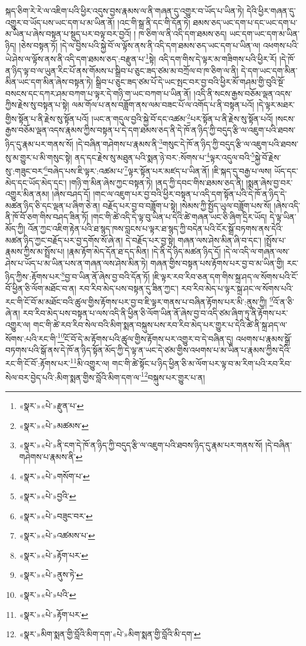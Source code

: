 སྐད་ཅིག་རེ་རེ་ལ་འཇིག་པའི་ཕྱིར་འདུས་བྱས་རྣམས་ལ་ནི་གཞན་དུ་འགྱུར་བ་ཡོད་པ་ཡིན་ཏེ། དེའི་ཕྱིར་གཞན་དུ་འགྱུར་བ་ཡོད་པས་ཡང་དག་པ་མ་ཡིན་ནོ། །འང་གི་སྒྲ་ནི་དང་གི་དོན་ཏེ། ཐམས་ཅད་ཡང་དག་པ་དང་ཡང་དག་པ་མ་ཡིན་པ་ཞེས་བསྟན་པ་སྡུད་པར་བལྟ་བར་བྱའོ། །
ཁ་ཅིག་ལ་ནི་འདི་དག་ཐམས་ཅད། ཡང་དག་ཡང་དག་མ་ཡིན་ཉིད། །ཅེས་བསྟན་ཏོ། །དེ་ལ་བྱིས་པའི་སྐྱེ་བོ་ལ་ལྟོས་ནས་ནི་འདི་དག་ཐམས་ཅད་ཡང་དག་པ་ཡིན་ལ། འཕགས་པའི་ཡེ་ཤེས་ལ་ལྟོས་ནས་ནི་འདི་དག་ཐམས་ཅད་:བརྫུན་པ་\footnote{«སྣར་»«པེ་»རྫུན་པ་}སྟེ། འདི་དག་གིས་དེ་ལྟར་མ་གཟིགས་པའི་ཕྱིར་རོ། །དེ་ཁོ་ན་ཉིད་ལྟ་བ་ལ་ཡུན་རིང་པོ་ནས་གོམས་པ་སྒྲིབ་པ་ཅུང་ཟད་ཙམ་མ་བཀྲོལ་བ་ཁ་ཅིག་ལ་ནི། དེ་དག་ཡང་དག་མིན་མིན་ཡང་དག་མིན་ཞེས་བསྟན་ཏེ། སྒྲིབ་པ་ཅུང་ཟད་ཙམ་པོ་དེ་ཡང་སྤང་བར་བྱ་བའི་ཕྱིར་མོ་གཤམ་གྱི་བུའི་སྔོ་བསངས་དང་དཀར་ཤམ་བཀག་པ་ལྟར་དེ་གཉི་ག་ཡང་བཀག་པ་ཡིན་ནོ། །འདི་ནི་སངས་རྒྱས་བཅོམ་ལྡན་འདས་ཀྱིས་རྗེས་སུ་བསྟན་པ་སྟེ། ལམ་གོལ་པ་ནས་བཟློག་ནས་ལམ་བཟང་པོ་ལ་འགོད་པ་ནི་བསྟན་པའོ། །དེ་ལྟར་མཐར་གྱིས་སྟོན་པ་ནི་རྗེས་སུ་སྟོན་པའོ། །ཡང་ན་གདུལ་བྱའི་སྐྱེ་བོ་དང་འཚམ་\footnote{«སྣར་»«པེ་»མཚམས་}པར་སྟོན་པ་ནི་རྗེས་སུ་སྟོན་པའོ། །སངས་རྒྱས་བཅོམ་ལྡན་འདས་རྣམས་ཀྱིས་བསྟན་པ་དེ་དག་ཐམས་ཅད་ནི་དེ་ཁོ་ན་ཉིད་ཀྱི་བདུད་རྩི་ལ་འཇུག་པའི་ཐབས་ཉིད་དུ་རྣམ་པར་གནས་སོ། །དེ་བཞིན་གཤེགས་པ་རྣམས་ནི་\footnote{«སྣར་»«པེ་»ནི་ངག་དེ་ཁོ་ན་ཉིད་ཀྱི་བདུད་རྩི་ལ་འཇུག་པའི་ཐབས་ཉིད་དུ་རྣམ་པར་གནས་སོ། །དེ་བཞིན་གཤེགས་པ་རྣམས་ནི་}གསུང་དེ་ཁོ་ན་ཉིད་ཀྱི་བདུད་རྩི་ལ་འཇུག་པའི་ཐབས་སུ་མ་གྱུར་པ་མི་གསུང་སྟེ། ནད་དང་རྗེས་སུ་མཐུན་པའི་སྨན་ཉེ་བར་:སོགས་པ་\footnote{«སྣར་»«པེ་»གསོག་པ་}ལྟར་འདུལ་བའི་\footnote{«སྣར་»«པེ་»བྱའི་}སྐྱེ་བོ་རྗེས་སུ་:གཟུང་བར་\footnote{«སྣར་»«པེ་»བཟུང་བར་}བཞེད་པས་ཇི་ལྟར་:འཚམ་པ་\footnote{«སྣར་»«པེ་»འཚམས་པ་}ལྟར་སྟོན་པར་མཛད་པ་ཡིན་ནོ། །ཇི་སྐད་དུ་བརྒྱ་པ་ལས། ཡོད་དང་མེད་དང་ཡོད་མེད་དང་། །གཉི་ག་མིན་ཞེས་ཀྱང་བསྟན་ཏེ། །ནད་ཀྱི་དབང་གིས་ཐམས་ཅད་ནི། །སྨན་ཞེས་བྱ་བར་འགྱུར་མིན་ནམ། །ཞེས་བཤད་དོ། །གང་ལ་འཇུག་པར་བྱ་བའི་ཕྱིར་བསྟན་པ་འདི་དག་སྟོན་པའི་དེ་ཁོ་ན་ཉིད་དེ་མཚན་ཉིད་ཅི་དང་ལྡན་པ་ཞིག་ཅེ་ན། བརྗོད་པར་བྱ་བ་བཟློག་པ་སྟེ། །སེམས་ཀྱི་སྤྱོད་ཡུལ་བཟློག་པས་སོ། །ཞེས་འདི་ནི་ཁོ་བོ་ཅག་གིས་བཤད་ཟིན་ཏོ། །གང་གི་ཚེ་འདི་དེ་ལྟ་བུ་ཡིན་པ་དེའི་ཚེ་གཞན་ཡང་ཅི་ཞིག་དྲིར་ཡོད། དེ་ལྟ་ཡིན་མོད་ཀྱི། འོན་ཀྱང་འཇིག་རྟེན་པའི་ཐ་སྙད་ཁས་བླངས་པ་ལྟར་ཐ་སྙད་ཀྱི་བདེན་པའི་ངོར་སྒྲོ་བཏགས་ནས་དེའི་མཚན་ཉིད་ཀྱང་བརྗོད་པར་བྱ་དགོས་སོ་ཞེ་ན། དེ་བརྗོད་པར་བྱ་སྟེ། གཞན་ལས་ཤེས་མིན་ཞི་བ་དང་། །སྤྲོས་པ་རྣམས་ཀྱིས་མ་སྤྲོས་པ། །རྣམ་རྟོག་མེད་དོན་ཐ་དད་མིན། །དེ་ནི་དེ་ཉིད་མཚན་ཉིད་དོ། །དེ་ལ་འདི་ལ་གཞན་ལས་ཤེས་པ་ཡོད་པ་མ་ཡིན་པས་ན་གཞན་ལས་ཤེས་མིན་ཏེ། གཞན་གྱིས་བསྟན་པས་རྟོགས་པར་བྱ་བ་མ་ཡིན་གྱི། རང་ཉིད་ཀྱིས་:རྟོགས་པར་\footnote{«སྣར་»«པེ་»རྟོག་པར་}བྱ་བ་ཡིན་ནོ་ཞེས་བྱ་བའི་དོན་ཏོ། །ཇི་ལྟར་རབ་རིབ་ཅན་དག་གིས་སྐྲ་ཤད་ལ་སོགས་པའི་ངོ་བོ་ཕྱིན་ཅི་ལོག་མཐོང་བ་ན། རབ་རིབ་མེད་པས་བསྟན་དུ་ཟིན་ཀྱང་། རབ་རིབ་མེད་པ་ལྟར་སྐྲ་ཤང་ལ་སོགས་པའི་རང་གི་ངོ་བོ་མ་མཐོང་བའི་ཚུལ་གྱིས་རྟོགས་པར་བྱ་བ་ཇི་ལྟར་གནས་པ་བཞིན་རྟོགས་པར་མི་:ནུས་ཀྱི། \footnote{«སྣར་»«པེ་»ནུས་ཏེ་}འོ་ན་ཅི་ཞེ་ན། རབ་རིབ་མེད་པས་བསྟན་པ་ལས་འདི་ནི་ཕྱིན་ཅི་ལོག་ཡིན་ནོ་ཞེས་བྱ་བ་འདི་ཙམ་ཞིག་ཏུ་ནི་རྟོགས་པར་འགྱུར་ལ། གང་གི་ཚེ་རབ་རིབ་སེལ་བའི་མིག་སྨན་བསྐུས་པས་རབ་རིབ་མེད་པར་གྱུར་པ་དེའི་ཚེ་ནི་སྐྲ་ཤད་ལ་སོགས་:པའི་རང་གི་\footnote{«སྣར་»«པེ་»པའི་}ངོ་བོ་དེ་མ་རྟོགས་པའི་ཚུལ་གྱིས་རྟོགས་པར་འགྱུར་བ་དེ་བཞིན་དུ། འཕགས་པ་རྣམས་སྒྲོ་བཏགས་པའི་སྒོ་ནས་དེ་ཁོ་ན་ཉིད་སྟོན་མོད་ཀྱི་དེ་ལྟ་ན་ཡང་དེ་ཙམ་གྱིས་འཕགས་པ་མ་ཡིན་པ་རྣམས་ཀྱིས་དེའི་རང་གི་ངོ་བོ་:རྟོགས་པར་\footnote{«སྣར་»«པེ་»རྟོག་པར་}མི་འགྱུར་ལ། གང་གི་ཚེ་སྟོང་པ་ཉིད་ཕྱིན་ཅི་མ་ལོག་པར་ལྟ་བ་མ་རིག་པའི་རབ་རིབ་སེལ་བར་བྱེད་པའི་:མིག་སྨན་གྱིས་བློའི་མིག་དག་ལ་\footnote{«སྣར་»མིག་སྨན་གྱི་བློའི་མིག་དག་«པེ་»མིག་སྨན་གྱི་བློའི་མི་དག་}བསྐུས་པར་གྱུར་པ་ན། 